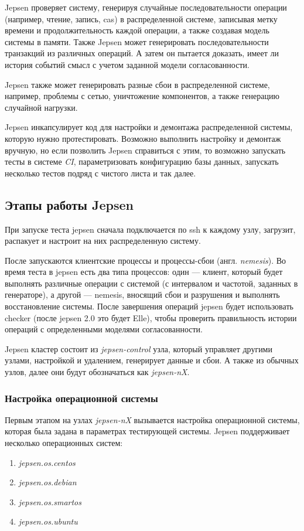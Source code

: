 \documentclass[12pt,  openany]{book}
\begin{document}
\par Jepsen проверяет систему, генерируя случайные последовательности операции (например, чтение, запись, cas) в распределенной системе, записывая метку времени и продолжительность каждой операции, а также создавая модель системы в памяти.  Также Jepsen может генерировать последовательности транзакций из различных операций. А затем он пытается доказать, имеет ли история событий смысл с учетом заданной модели согласованности.
\par Jepsen также может генерировать разные сбои в распределенной системе, например, проблемы с сетью, уничтожение компонентов, а также генерацию случайной нагрузки.
\par Jepsen инкапсулирует код для настройки и демонтажа распределенной системы, которую нужно протестировать. Возможно выполнить настройку и демонтаж вручную, но если позволить Jepsen справиться с этим, то возможно запускать тесты в системе \textit{CI}, параметризовать конфигурацию базы данных, запускать несколько тестов подряд с чистого листа и так далее.

\subsection{Этапы работы Jepsen}
При запуске теста jepsen сначала подключается по ssh к каждому узлу, загрузит, распакует и настроит на них распределенную систему.
\par После запускаются клиентские процессы и процессы-сбои (англ. \textit{nemesis}). Во время теста в jepsen есть два типа процессов: один --- клиент, который будет выполнять различные операции с системой (с интервалом и частотой, заданных в генераторе), а другой --- nemesis, вносящий сбои и разрушения и выполнять восстановление системы. После завершения операций jepsen будет использовать checker (после jepsen 2.0 это будет Elle), чтобы проверить правильность истории операций с определенными моделями согласованности.
\par Jepsen кластер состоит из \textit{jepsen-control} узла, который управляет другими узлами, настройкой и удалением, генерирует данные и сбои. А также из обычных узлов, далее они будут обозначаться как \textit{jepsen-nX}. 
\subsubsection{Настройка операционной системы}
Первым этапом на узлах \textit{jepsen-nX} вызывается настройка операционной системы,  которая была задана в параметрах тестирующей системы. Jepsen поддерживает несколько операционных систем: 
\begin{enumerate}
\item \textit{jepsen.os.centos}
\item \textit{jepsen.os.debian}
\item \textit{jepsen.os.smartos}
\item \textit{jepsen.os.ubuntu}
\end{enumerate}
\end{document}
